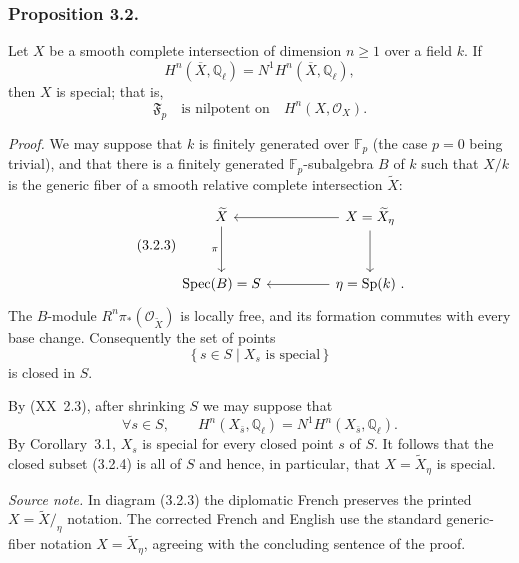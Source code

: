 \subsubsection*{Proposition 3.2.}
Let $X$ be a smooth complete intersection of dimension $n\geq1$ over a
field $k$.  If
\begin{equation}\tag{3.2.1}
H^n(\overline X,\mathbb Q_\ell)=N^1H^n(\overline X,\mathbb Q_\ell),
\end{equation}
then $X$ is special; that is,
\begin{equation}\tag{3.2.2}
\mathfrak F_p\quad\text{is nilpotent on}\quad H^n(X,\mathcal O_X).
\end{equation}

\medskip
\noindent\emph{Proof.}
We may suppose that $k$ is finitely generated over $\mathbb F_p$ (the case
$p=0$ being trivial), and that there is a finitely generated
$\mathbb F_p$-subalgebra $B$ of $k$ such that $X/k$ is the generic fiber of a
smooth relative complete intersection $\widetilde X$:
\begin{equation}\tag{3.2.3}
\begin{tikzcd}[column sep=4.5em,row sep=3em]
\widetilde X \arrow[d,"\pi"'] &
X=\widetilde X_\eta \arrow[l] \arrow[d] \\
\operatorname{Spec}(B)=S & \eta=\operatorname{Sp}(k)\ . \arrow[l]
\end{tikzcd}
\end{equation}
The $B$-module $R^n\pi_*(\mathcal O_{\widetilde X})$ is locally free, and its
formation commutes with every base change.  Consequently the set of points
\begin{equation}\tag{3.2.4}
\{\,s\in S\mid X_s\text{ is special}\,\}
\end{equation}
is closed in $S$.

By (XX~2.3), after shrinking $S$ we may suppose that
\begin{equation}\tag{3.2.5}
\forall s\in S,\qquad
H^n(X_{\bar s},\mathbb Q_\ell)=N^1H^n(X_{\bar s},\mathbb Q_\ell).
\end{equation}
By Corollary~3.1, $X_s$ is special for every closed point $s$ of $S$.
It follows that the closed subset (3.2.4) is all of $S$ and hence, in
particular, that $X=\widetilde X_\eta$ is special.

\medskip
\noindent\emph{Source note.}
In diagram (3.2.3) the diplomatic French preserves the printed
$X=\widetilde X/_{\eta}$ notation.  The corrected French and English use the
standard generic-fiber notation $X=\widetilde X_\eta$, agreeing with the
concluding sentence of the proof.
